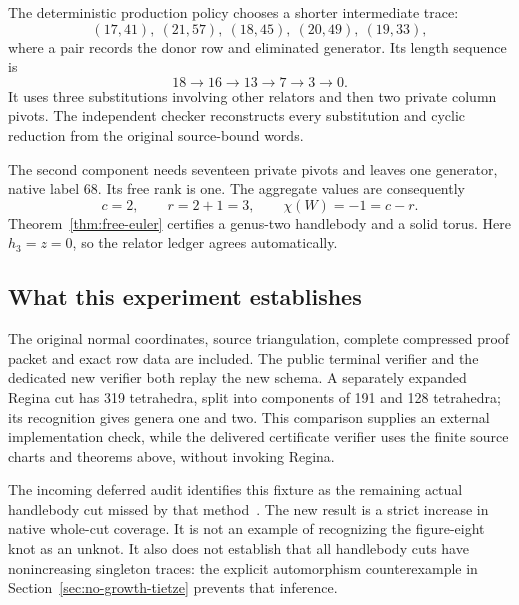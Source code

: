 The deterministic production policy chooses a shorter intermediate trace:
\[
 (17,41),\ (21,57),\ (18,45),\ (20,49),\ (19,33),
\]
where a pair records the donor row and eliminated generator. Its length
sequence is
\[
 18\longrightarrow16\longrightarrow13\longrightarrow7
 \longrightarrow3\longrightarrow0.
\]
It uses three substitutions involving other relators and then two private
column pivots. The independent checker reconstructs every substitution and
cyclic reduction from the original source-bound words.

The second component needs seventeen private pivots and leaves one generator,
native label 68. Its free rank is one. The aggregate values are consequently
\[
 c=2,\qquad r=2+1=3,\qquad \chi(W)=-1=c-r.
\]
Theorem~\ref{thm:free-euler} certifies a genus-two handlebody and a solid torus.
Here $h_3=z=0$, so the relator ledger agrees automatically.

\subsection{What this experiment establishes}

The original normal coordinates, source triangulation, complete compressed
proof packet and exact row data are included. The public terminal verifier
and the dedicated new verifier both replay the new schema. A separately
expanded Regina cut has 319 tetrahedra, split into components of 191 and 128
tetrahedra; its recognition gives genera one and two. This comparison supplies
an external implementation check, while the delivered certificate verifier
uses the finite source charts and theorems above, without invoking Regina.

The incoming deferred audit identifies this fixture as the remaining actual
handlebody cut missed by that method~\cite{DeferredForests}. The new result is
a strict increase in native whole-cut coverage. It is not an example of
recognizing the figure-eight knot as an unknot. It also does not establish that
all handlebody cuts have nonincreasing singleton traces: the explicit
automorphism counterexample in Section~\ref{sec:no-growth-tietze} prevents
that inference.
